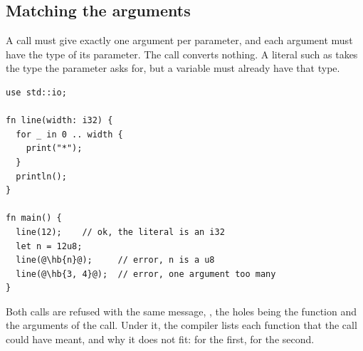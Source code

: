 \subsection{Matching the arguments}

A call must give exactly one argument per parameter, and each argument must have
the type of its parameter. The call converts nothing. A literal such as
 takes the type the parameter asks for, but a variable must already
have that type.

\begin{lstlisting}[style=coloredverbatimError, escapechar=@, caption=Arguments that do not match the parameters]
use std::io;

fn line(width: i32) {
  for _ in 0 .. width {
    print("*");
  }
  println();
}

fn main() {
  line(12);    // ok, the literal is an i32
  let n = 12u8;
  line(@\hb{n}@);     // error, n is a u8
  line(@\hb{3, 4}@);  // error, one argument too many
}
\end{lstlisting}

Both calls are refused with the same message, , the holes being the function
and the arguments of the call. Under it, the compiler lists each function that
the call could have meant, and why it does not fit:
 for the first,
 for the second.
